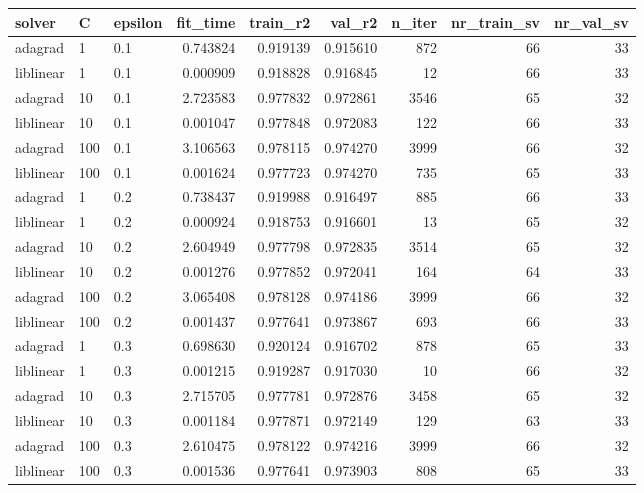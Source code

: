 \begin{tabular}{lllrrrrrr}
\toprule
   solver &   C & epsilon &  fit\_time &  train\_r2 &   val\_r2 &  n\_iter &  nr\_train\_sv &  nr\_val\_sv \\
\midrule
  adagrad &   1 &     0.1 &  0.743824 &  0.919139 & 0.915610 &     872 &           66 &         33 \\
liblinear &   1 &     0.1 &  0.000909 &  0.918828 & 0.916845 &      12 &           66 &         33 \\
  adagrad &  10 &     0.1 &  2.723583 &  0.977832 & 0.972861 &    3546 &           65 &         32 \\
liblinear &  10 &     0.1 &  0.001047 &  0.977848 & 0.972083 &     122 &           66 &         33 \\
  adagrad & 100 &     0.1 &  3.106563 &  0.978115 & 0.974270 &    3999 &           66 &         32 \\
liblinear & 100 &     0.1 &  0.001624 &  0.977723 & 0.974270 &     735 &           65 &         33 \\
  adagrad &   1 &     0.2 &  0.738437 &  0.919988 & 0.916497 &     885 &           66 &         33 \\
liblinear &   1 &     0.2 &  0.000924 &  0.918753 & 0.916601 &      13 &           65 &         32 \\
  adagrad &  10 &     0.2 &  2.604949 &  0.977798 & 0.972835 &    3514 &           65 &         32 \\
liblinear &  10 &     0.2 &  0.001276 &  0.977852 & 0.972041 &     164 &           64 &         33 \\
  adagrad & 100 &     0.2 &  3.065408 &  0.978128 & 0.974186 &    3999 &           66 &         32 \\
liblinear & 100 &     0.2 &  0.001437 &  0.977641 & 0.973867 &     693 &           66 &         33 \\
  adagrad &   1 &     0.3 &  0.698630 &  0.920124 & 0.916702 &     878 &           65 &         33 \\
liblinear &   1 &     0.3 &  0.001215 &  0.919287 & 0.917030 &      10 &           66 &         32 \\
  adagrad &  10 &     0.3 &  2.715705 &  0.977781 & 0.972876 &    3458 &           65 &         32 \\
liblinear &  10 &     0.3 &  0.001184 &  0.977871 & 0.972149 &     129 &           63 &         33 \\
  adagrad & 100 &     0.3 &  2.610475 &  0.978122 & 0.974216 &    3999 &           66 &         32 \\
liblinear & 100 &     0.3 &  0.001536 &  0.977641 & 0.973903 &     808 &           65 &         33 \\
\bottomrule
\end{tabular}
